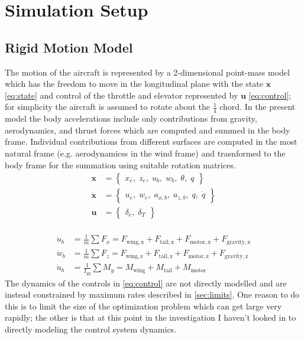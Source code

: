 \documentclass{article}
\begin{document}
\section{Simulation Setup}

\subsection{Rigid Motion Model}
The motion of the aircraft is represented by a 2-dimensional point-mass model which has the freedom to move in the longitudinal plane with the state $\mathbf{x} $\ref{eq:state} and control of the throttle and elevator represented by $\mathbf{u}$ \ref{eq:control}; for simplicity the aircraft is assumed to rotate about the $\frac{1}{4}$ chord.
In the present model the body accelerations include only contributions from gravity, aerodynamics, and thrust forces which are computed and summed in the body frame.
Individual contributions from different surfaces are computed in the most natural frame (e.g. aerodynamicss in the wind frame) and trasnformed to the body frame for the summation using suitable rotation matrices.
\\
\begin{align} 
	\mathbf{x} &= \begin{Bmatrix}
		x_e,\; z_e,\; u_b,\; w_b,\; \theta,\; q
	\end{Bmatrix} \label{eq:state}\\
	\dot{\mathbf{x}} &= \begin{Bmatrix}
		u_e,\; w_e,\; a_{x,b},\; a_{z,b},\; q,\; \dot{q}
	\end{Bmatrix} \label{eq:deriv}\\
	\mathbf{u} &= \begin{Bmatrix}
		\delta_e,\; \delta_T \label{eq:control}
	\end{Bmatrix}
\end{align}
\\

\begin{align}
	\dot{u}_b &= \frac{1}{m}\sum F_x \label{eq:x-force-sum} = F_\mathrm{wing,x} + F_\mathrm{tail,x} + F_\mathrm{motor,x} + F_\mathrm{gravity,x}\\
	\dot{w}_b &= \frac{1}{m}\sum F_z \label{eq:z-force-sum} = F_\mathrm{wing,z} + F_\mathrm{tail,z} + F_\mathrm{motor,z} + F_\mathrm{gravity,z}\\
	\dot{u}_b &= \frac{1}{I_{yy}}\sum M_y \label{eq:y-mom-sum}	= M_\mathrm{wing} + M_\mathrm{tail} +  M_\mathrm{motor}
\end{align}
The dynamics of the controls in \cref{eq:control} are not directly modelled and are instead constrained by maximum rates described in \cref{sec:limits}. 
One reason to do this is to limit the size of the optimization problem which can get large very rapidly; the other is that at this point in the investigation I haven't looked in to directly modeling the control system dynamics. 
 
\end{document}
